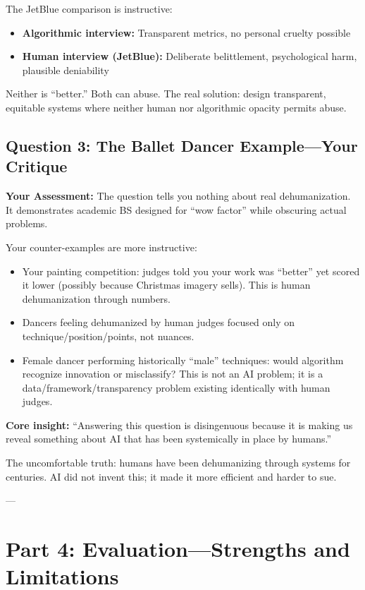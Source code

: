 \documentclass[11pt,twoside]{article}
\begin{document}
The JetBlue comparison is instructive:
\begin{itemize}
\item \textbf{Algorithmic interview:} Transparent metrics, no personal cruelty possible
\item \textbf{Human interview (JetBlue):} Deliberate belittlement, psychological harm, plausible deniability
\end{itemize}

Neither is ``better.'' Both can abuse. The real solution: design transparent, equitable systems where neither human nor algorithmic opacity permits abuse.

\subsection{Question 3: The Ballet Dancer Example---Your Critique}

\textbf{Your Assessment:} The question tells you nothing about real dehumanization. It demonstrates academic BS designed for ``wow factor'' while obscuring actual problems.

Your counter-examples are more instructive:
\begin{itemize}
\item Your painting competition: judges told you your work was ``better'' yet scored it lower (possibly because Christmas imagery sells). This is human dehumanization through numbers.
\item Dancers feeling dehumanized by human judges focused only on technique/position/points, not nuances.
\item Female dancer performing historically ``male'' techniques: would algorithm recognize innovation or misclassify? This is not an AI problem; it is a data/framework/transparency problem existing identically with human judges.
\end{itemize}

\textbf{Core insight:} ``Answering this question is disingenuous because it is making us reveal something about AI that has been systemically in place by humans.''

The uncomfortable truth: humans have been dehumanizing through systems for centuries. AI did not invent this; it made it more efficient and harder to sue.

---

\section{Part 4: Evaluation---Strengths and Limitations}
\end{document}
